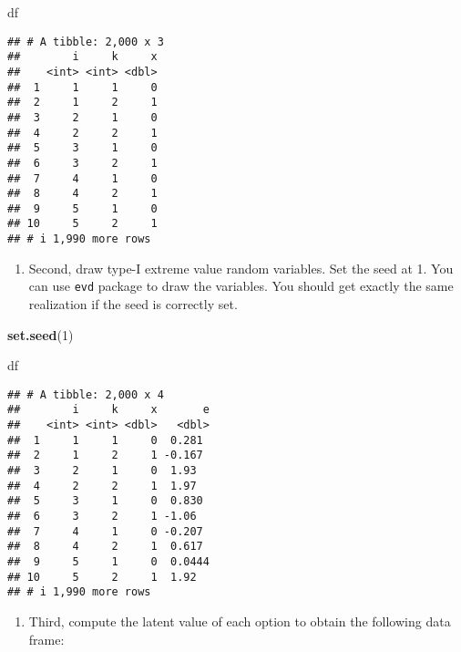 \documentclass[
]{book}
\newenvironment{Shaded}{\begin{snugshade}}{\end{snugshade}}
\newcommand{\DecValTok}[1]{\textcolor[rgb]{0.00,0.00,0.81}{#1}}
\newcommand{\FunctionTok}[1]{\textcolor[rgb]{0.13,0.29,0.53}{\textbf{#1}}}
\newcommand{\NormalTok}[1]{#1}
\providecommand{\tightlist}{%
  \setlength{\itemsep}{0pt}\setlength{\parskip}{0pt}}
\begin{document}
\begin{Shaded}
\begin{Highlighting}[]
\NormalTok{df}
\end{Highlighting}
\end{Shaded}

\begin{verbatim}
## # A tibble: 2,000 x 3
##        i     k     x
##    <int> <int> <dbl>
##  1     1     1     0
##  2     1     2     1
##  3     2     1     0
##  4     2     2     1
##  5     3     1     0
##  6     3     2     1
##  7     4     1     0
##  8     4     2     1
##  9     5     1     0
## 10     5     2     1
## # i 1,990 more rows
\end{verbatim}

\begin{enumerate}
\def\labelenumi{\arabic{enumi}.}
\setcounter{enumi}{1}
\tightlist
\item
  Second, draw type-I extreme value random variables. Set the seed at 1. You can use \texttt{evd} package to draw the variables. You should get exactly the same realization if the seed is correctly set.
\end{enumerate}

\begin{Shaded}
\begin{Highlighting}[]
\FunctionTok{set.seed}\NormalTok{(}\DecValTok{1}\NormalTok{)}
\end{Highlighting}
\end{Shaded}

\begin{Shaded}
\begin{Highlighting}[]
\NormalTok{df}
\end{Highlighting}
\end{Shaded}

\begin{verbatim}
## # A tibble: 2,000 x 4
##        i     k     x       e
##    <int> <int> <dbl>   <dbl>
##  1     1     1     0  0.281 
##  2     1     2     1 -0.167 
##  3     2     1     0  1.93  
##  4     2     2     1  1.97  
##  5     3     1     0  0.830 
##  6     3     2     1 -1.06  
##  7     4     1     0 -0.207 
##  8     4     2     1  0.617 
##  9     5     1     0  0.0444
## 10     5     2     1  1.92  
## # i 1,990 more rows
\end{verbatim}

\begin{enumerate}
\def\labelenumi{\arabic{enumi}.}
\setcounter{enumi}{2}
\tightlist
\item
  Third, compute the latent value of each option to obtain the following data frame:
\end{enumerate}
\end{document}
